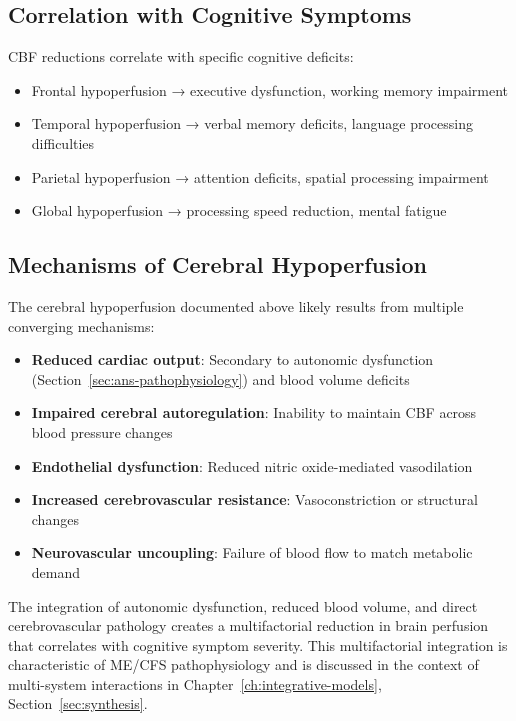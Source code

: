 \subsection{Correlation with Cognitive Symptoms}

CBF reductions correlate with specific cognitive deficits:

\begin{itemize}
    \item Frontal hypoperfusion → executive dysfunction, working memory impairment
    \item Temporal hypoperfusion → verbal memory deficits, language processing difficulties
    \item Parietal hypoperfusion → attention deficits, spatial processing impairment
    \item Global hypoperfusion → processing speed reduction, mental fatigue
\end{itemize}

\subsection{Mechanisms of Cerebral Hypoperfusion}

The cerebral hypoperfusion documented above likely results from multiple converging mechanisms:

\begin{itemize}
    \item \textbf{Reduced cardiac output}: Secondary to autonomic dysfunction (Section~\ref{sec:ans-pathophysiology}) and blood volume deficits~\cite{Streeten1998blood}
    \item \textbf{Impaired cerebral autoregulation}: Inability to maintain CBF across blood pressure changes~\cite{Barnden2011brainstem}
    \item \textbf{Endothelial dysfunction}: Reduced nitric oxide-mediated vasodilation
    \item \textbf{Increased cerebrovascular resistance}: Vasoconstriction or structural changes
    \item \textbf{Neurovascular uncoupling}: Failure of blood flow to match metabolic demand
\end{itemize}

The integration of autonomic dysfunction, reduced blood volume, and direct cerebrovascular pathology creates a multifactorial reduction in brain perfusion that correlates with cognitive symptom severity. This multifactorial integration is characteristic of ME/CFS pathophysiology and is discussed in the context of multi-system interactions in Chapter~\ref{ch:integrative-models}, Section~\ref{sec:synthesis}.

